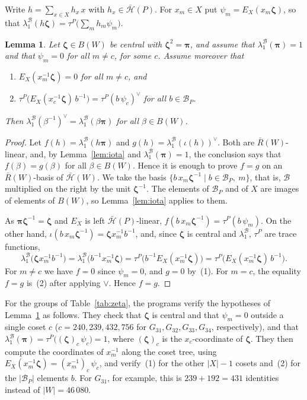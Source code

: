 \documentclass[11pt, reqno]{amsart}
\newcommand{\cB}{\mathcal{B}}
\newcommand{\cH}{\mathcal{H}}
\numberwithin{equation}{section}
\newtheorem{lemma}[theorem]{Lemma}
\theoremstyle{remark}
\begin{document}
Write $h=\sum_{x\in X}h_x\,x$ with $h_x\in\bar{\cH}(P)$. For $x_m\in X$ put $\psi_m=E_X(x_m\boldsymbol\zeta)$, so that $\lambda_1^{\cB}(h\boldsymbol\zeta)=\tau^P\bigl(\sum_mh_m\psi_m\bigr)$.

\begin{lemma}\label{lem:zeta}
	Let $\boldsymbol\zeta\in B(W)$ be central with $\boldsymbol\zeta^2=\boldsymbol\pi$, and assume that $\lambda_1^{\cB}(\boldsymbol\pi)=1$ and that $\psi_m=0$ for all $m\neq c$, for some $c$. Assume moreover that
	\begin{enumerate}
		\item $E_X(x_m^{-1}\boldsymbol\zeta)=0$ for all $m\ne c$, and \smallbreak
		\item $\tau^P\bigl(E_X(x_c^{-1}\boldsymbol\zeta)\,b^{-1}\bigr)=\tau^P(b\,\psi_c)^\vee$ for all $b\in\cB_P$.
	\end{enumerate}
	Then $\lambda^{\mathcal B}_1(\beta^{-1})^\vee=\lambda^{\mathcal B}_1(\beta\boldsymbol\pi)$
	for all $\beta\in B(W)$.
\end{lemma}
\begin{proof}
	Let $f(h)=\lambda_1^{\cB}(h\boldsymbol\pi)$ and $g(h)=\lambda_1^{\cB}(\iota(h))^\vee$. Both are $\bar R(W)$-linear, and, by Lemma~\ref{lem:iota} and $\lambda_1^{\cB}(\boldsymbol\pi)=1$, the conclusion says that $f(\beta)=g(\beta)$ for all $\beta\in B(W)$. Hence it is enough to prove $f=g$ on an $\bar R(W)$-basis of $\bar{\cH}(W)$. We take the basis $\{b\,x_m\boldsymbol\zeta^{-1}\mid b\in\cB_P,\ m\}$, that is, $\cB$ multiplied on the right by the unit $\boldsymbol\zeta^{-1}$. The elements of $\cB_P$ and of $X$ are images of elements of $B(W)$, so Lemma~\ref{lem:iota} applies to them.
	
	As $\boldsymbol\pi\boldsymbol\zeta^{-1}=\boldsymbol\zeta$ and $E_X$ is left $\bar{\cH}(P)$-linear, $f(b\,x_m\boldsymbol\zeta^{-1})=\tau^P(b\,\psi_m)$. On the other hand, $\iota(b\,x_m\boldsymbol\zeta^{-1})=\boldsymbol\zeta x_m^{-1}b^{-1}$, and, since $\boldsymbol\zeta$ is central and $\lambda_1^{\cB}$, $\tau^P$ are trace functions,
	\[
	\lambda_1^{\cB}\bigl(\boldsymbol\zeta x_m^{-1}b^{-1}\bigr)=\lambda_1^{\cB}\bigl(b^{-1}x_m^{-1}\boldsymbol\zeta\bigr)=\tau^P\bigl(b^{-1}E_X(x_m^{-1}\boldsymbol\zeta)\bigr)=\tau^P\bigl(E_X(x_m^{-1}\boldsymbol\zeta)\,b^{-1}\bigr).
	\]
	For $m\neq c$ we have $f=0$ since $\psi_m=0$, and $g=0$ by~(1). For $m=c$, the equality $f=g$ is~(2) after applying $\vee$. Hence $f=g$.
\end{proof}
For the groups of Table~\ref{tab:zeta}, the programs verify the hypotheses of Lemma~\ref{lem:zeta} as follows. They check that $\boldsymbol\zeta$ is central and that $\psi_m=0$ outside a single coset $c$ ($c=240,239,432,756$ for $G_{31},G_{32},G_{33},G_{34}$, respectively), and that $\lambda_1^{\cB}(\boldsymbol\pi)=\tau^P\bigl((\boldsymbol\zeta)_c\,\psi_c\bigr)=1$, where $(\boldsymbol\zeta)_c$ is the $x_c$-coordinate of $\boldsymbol\zeta$. They then compute the coordinates of $x_m^{-1}$ along the coset tree, using $E_X(x_m^{-1}\boldsymbol\zeta)=(x_m^{-1})_c\,\psi_c$, and verify~(1) for the other $|X|-1$ cosets and~(2) for the $|\cB_P|$ elements $b$. For $G_{31}$, for example, this is $239+192=431$ identities instead of $|W|=46\,080$.
\end{document}
